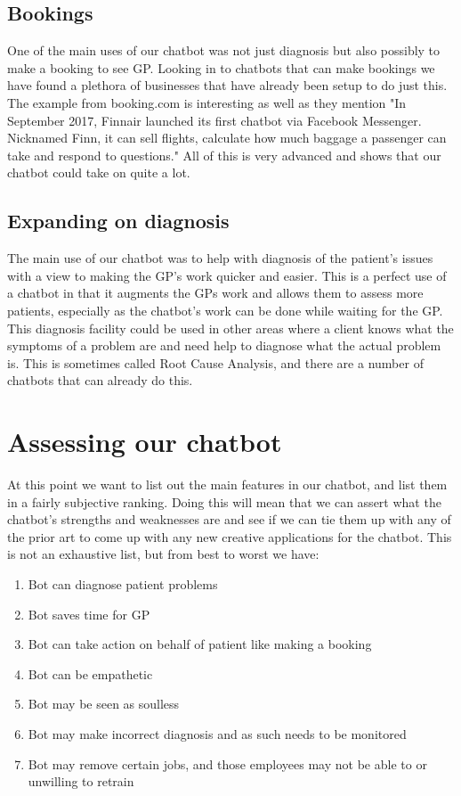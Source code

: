 \documentclass{article}
\begin{document}
\subsection{Bookings}
One of the main uses of our chatbot was not just diagnosis but also possibly to make a booking to see GP. Looking in to chatbots that can make bookings we have found a plethora of businesses that have already been setup to do just this.\cite{futr}\cite{booking}\cite{velma} The example from booking.com is interesting as well as they mention "In September 2017, Finnair launched its first chatbot via Facebook Messenger. Nicknamed Finn, it can sell flights, calculate how much baggage a passenger can take and respond to questions." All of this is very advanced and shows that our chatbot could take on quite a lot.

\subsection{Expanding on diagnosis}
The main use of our chatbot was to help with diagnosis of the patient's issues with a view to making the GP's work quicker and easier. This is a perfect use of a chatbot in that it augments the GPs work and allows them to assess more patients, especially as the chatbot's work can be done while waiting for the GP. 
This diagnosis facility could be used in other areas where a client knows what the symptoms of a problem are and need help to diagnose what the actual problem is. This is sometimes called Root Cause Analysis, and there are a number of chatbots that can already do this. \cite{gyan}\cite{devops}

\section{Assessing our chatbot}
At this point we want to list out the main features in our chatbot, and list them in a fairly subjective ranking. Doing this will mean that we can assert what the chatbot's strengths and weaknesses are and see if we can tie them up with any of the prior art to come up with any new creative applications for the chatbot.
\smallbreak
This is not an exhaustive list, but from best to worst we have:
\begin{enumerate}
    \item Bot can diagnose patient problems
    \item Bot saves time for GP
    \item Bot can take action on behalf of patient like making a booking
    \item Bot can be empathetic
    \item Bot may be seen as soulless
    \item Bot may make incorrect diagnosis and as such needs to be monitored
    \item Bot may remove certain jobs, and those employees may not be able to or unwilling to retrain
\end{enumerate}
\end{document}

